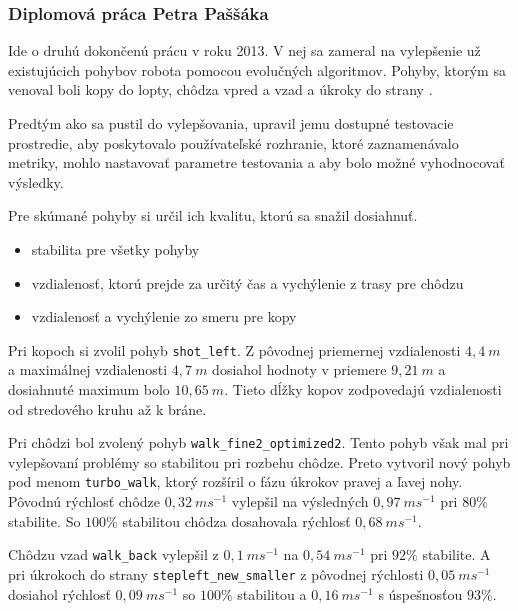 \subsubsection{Diplomová práca Petra Paššáka} \label{sec_passakp}
Ide o druhú dokončenú prácu v roku 2013. V nej sa zameral na vylepšenie už existujúcich pohybov robota pomocou evolučných algoritmov. Pohyby, ktorým sa venoval boli kopy do lopty, chôdza vpred a vzad a úkroky do strany \cite{passak_peter}.

Predtým ako sa pustil do vylepšovania, upravil jemu dostupné testovacie prostredie, aby poskytovalo používateľské rozhranie, ktoré zaznamenávalo metriky, mohlo nastavovať parametre testovania a aby bolo možné vyhodnocovať výsledky.

Pre skúmané pohyby si určil ich kvalitu, ktorú sa snažil dosiahnuť.
\begin{itemize}
	\item stabilita pre všetky pohyby
	\item vzdialenosť, ktorú prejde za určitý čas a vychýlenie z trasy pre chôdzu
	\item vzdialenosť a vychýlenie zo smeru pre kopy
\end{itemize}

Pri kopoch si zvolil pohyb \texttt{shot\_left}. Z pôvodnej priemernej vzdialenosti $4,4~m$ a maximálnej vzdialenosti $4,7~m$ dosiahol hodnoty v priemere $9,21~m$ a dosiahnuté maximum bolo $10,65~m$. Tieto dĺžky kopov zodpovedajú vzdialenosti od stredového kruhu až k bráne.

Pri chôdzi bol zvolený pohyb \texttt{walk\_fine2\_optimized2}. Tento pohyb však mal pri vylepšovaní problémy so stabilitou pri rozbehu chôdze. Preto vytvoril nový pohyb pod menom \texttt{turbo\_walk}, ktorý rozšíril o fázu úkrokov pravej a ľavej nohy. Pôvodnú rýchlosť chôdze $0,32~ms^{-1}$ vylepšil na výsledných $0,97~ms^{-1}$ pri  $80\%$ stabilite. So $100\%$ stabilitou chôdza dosahovala rýchlosť $0,68~ms^{-1}$.

Chôdzu vzad \texttt{walk\_back} vylepšil z $0,1~ms^{-1}$ na $0,54~ms^{-1}$ pri $92\%$ stabilite. A pri úkrokoch do strany \texttt{stepleft\_new\_smaller} z pôvodnej rýchlosti $0,05~ms^{-1}$ dosiahol rýchlosť $0,09~ms^{-1}$ so $100\%$ stabilitou a $0,16~ms^{-1}$ s úspešnosťou $93\%$.